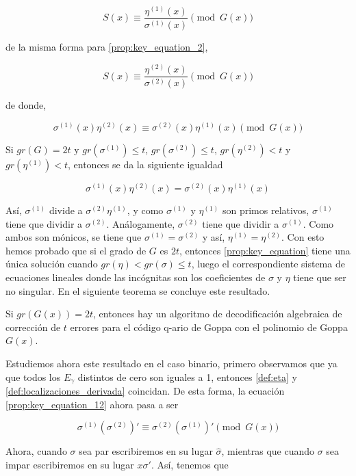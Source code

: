 $$S(x) \equiv \frac{\eta^{(1)}(x)}{\sigma^{(1)}(x)} \pmod{G(x)}$$

de la misma forma para \ref{prop:key_equation_2},

$$S(x) \equiv \frac{\eta^{(2)}(x)}{\sigma^{(2)}(x)} \pmod{G(x)}$$

de donde,

\begin{equation}
    \label{prop:key_equation_12}
    \sigma^{(1)}(x) \eta^{(2)}(x) \equiv \sigma^{(2)}(x) \eta^{(1)}(x) \pmod{G(x)}
\end{equation}

Si $gr(G) = 2t$ y $gr(\sigma^{(1)}) \leq t$, $gr(\sigma^{(2)}) \leq t$, $gr(\eta^{(2)}) < t$ y $gr(\eta^{(1)}) < t$, entonces se da la siguiente igualdad

\begin{equation}
    \label{prop:key_equation_caso1}
    \sigma^{(1)}(x) \eta^{(2)}(x) = \sigma^{(2)}(x) \eta^{(1)}(x)
\end{equation}

Así, $\sigma^{(1)}$ divide a $\sigma^{(2)} \eta^{(1)}$, y como $\sigma^{(1)}$ y $\eta^{(1)}$ son primos relativos, $\sigma^{(1)}$ tiene que dividir a $\sigma^{(2)}$. Análogamente, $\sigma^{(2)}$ tiene que dividir a $\sigma^{(1)}$. Como ambos son mónicos, se tiene que $\sigma^{(1)} = \sigma^{(2)}$ y así, $\eta^{(1)} = \eta^{(2)}$. Con esto hemos probado que si el grado de $G$ es $2t$, entonces \ref{prop:key_equation} tiene una única solución cuando $gr(\eta) < gr(\sigma) \leq t$, luego el correspondiente sistema de ecuaciones lineales donde las incógnitas son los coeficientes de $\sigma$ y $\eta$ tiene que ser no singular. En el siguiente teorema se concluye este resultado.

\begin{theorem}
    Si $gr(G(x)) = 2t$, entonces hay un algoritmo de decodificación algebraica de corrección de $t$ errores para el código q-ario de Goppa con el polinomio de Goppa $G(x)$.
\end{theorem}

Estudiemos ahora este resultado en el caso binario, primero observamos que ya que todos los $E_\gamma$ distintos de cero son iguales a 1, entonces \ref{def:eta} y \ref{def:localizaciones_derivada} coincidan. De esta forma, la ecuación \ref{prop:key_equation_12} ahora pasa a ser

$$\sigma^{(1)} \left( \sigma^{(2)} \right) ' \equiv \sigma^{(2)} \left( \sigma^{(1)} \right) ' \pmod{G(x)}$$

Ahora, cuando $\sigma$ sea par escribiremos en su lugar $\hat{\sigma}$, mientras que cuando $\sigma$ sea impar escribiremos en su lugar $x \sigma '$. Así, tenemos que

